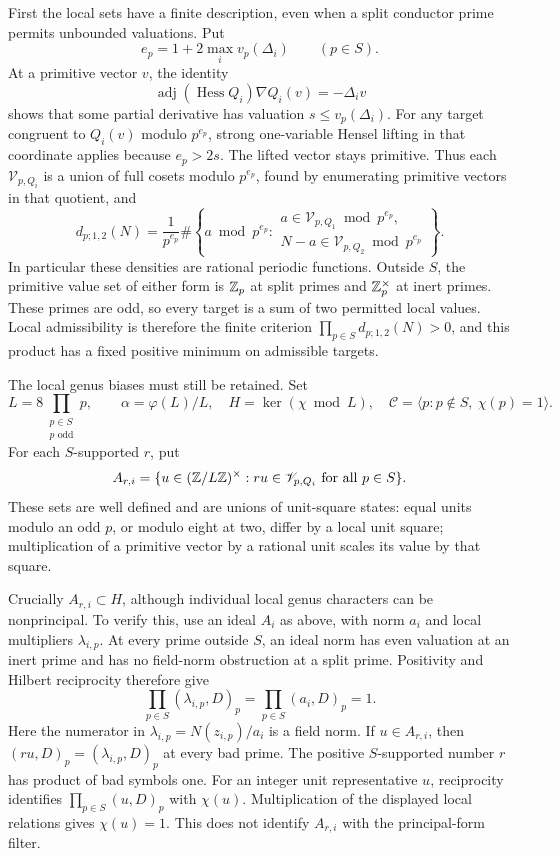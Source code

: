 First the local sets have a finite description, even when a split
conductor prime permits unbounded valuations. Put
\[
 e_p=1+2\max_i v_p(\Delta_i)\qquad(p\in S).
\]
At a primitive vector \(v\), the identity
\[
 \operatorname{adj}(\operatorname{Hess}Q_i)\nabla Q_i(v)
                  =-\Delta_i v
\]
shows that some partial derivative has valuation
\(s\le v_p(\Delta_i)\). For any target congruent to \(Q_i(v)\)
modulo \(p^{e_p}\), strong one-variable Hensel lifting in that
coordinate applies because \(e_p>2s\). The lifted vector stays
primitive. Thus each \(\mathscr V_{p,Q_i}\) is a union of full
cosets modulo \(p^{e_p}\), found by enumerating primitive vectors
in that quotient, and
\begin{equation}\label{eq:norm-local-density-finite}
 d_{p;1,2}(N)=\frac1{p^{e_p}}
 \#\left\{a\bmod p^{e_p}:
 \begin{array}{l}
 a\in\mathscr V_{p,Q_1}\bmod p^{e_p},\\
 N-a\in\mathscr V_{p,Q_2}\bmod p^{e_p}
 \end{array}\right\}.
\end{equation}
In particular these densities are rational periodic functions.
Outside \(S\), the primitive value set of either form is \(\mathbb Z_p\)
at split primes and \(\mathbb Z_p^\times\) at inert primes. These primes
are odd, so every target is a sum of two permitted local values.
Local admissibility is therefore the finite criterion
\(\prod_{p\in S}d_{p;1,2}(N)>0\), and this product has a fixed
positive minimum on admissible targets.

The local genus biases must still be retained. Set
\[
 L=8\prod_{\substack{p\in S\\p\text{ odd}}}p,\qquad
 \alpha=\varphi(L)/L,\quad H=\ker(\chi\bmod L),\quad
 \mathcal C=\langle p:p\notin S,\ \chi(p)=1\rangle.
\]
For each \(S\)-supported \(r\), put
\[
 A_{r,i}=\{u\in(\mathbb Z/L\mathbb Z)^\times:
                      ru\in\mathscr V_{p,Q_i}\text{ for all }p\in S\}.
\]
These sets are well defined and are unions of unit-square states:
equal units modulo an odd \(p\), or modulo eight at two, differ
by a local unit square; multiplication of a primitive vector by a
rational unit scales its value by that square.

Crucially \(A_{r,i}\subset H\), although individual local genus
characters can be nonprincipal. To verify this, use an ideal \(A_i\)
as above, with norm \(a_i\) and local multipliers \(\lambda_{i,p}\).
At every prime outside \(S\), an ideal norm has even valuation at
an inert prime and has no field-norm obstruction at a split prime.
Positivity and Hilbert reciprocity therefore give
\[
 \prod_{p\in S}(\lambda_{i,p},D)_p
      =\prod_{p\in S}(a_i,D)_p=1.
\]
Here the numerator in \(\lambda_{i,p}=N(z_{i,p})/a_i\) is a
field norm. If \(u\in A_{r,i}\), then
\((ru,D)_p=(\lambda_{i,p},D)_p\) at every bad prime.
The positive \(S\)-supported number \(r\) has product of bad
symbols one. For an integer unit representative \(u\), reciprocity
identifies \(\prod_{p\in S}(u,D)_p\) with \(\chi(u)\).
Multiplication of the displayed local relations gives \(\chi(u)=1\).
This does not identify \(A_{r,i}\) with the principal-form filter.

